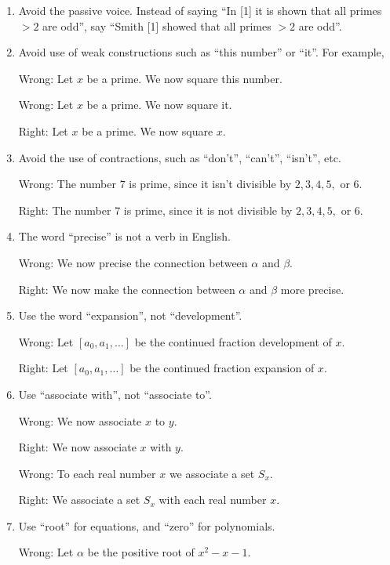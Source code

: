 \documentclass[12pt]{article}
\begin{document}
\begin{enumerate}

\item Avoid the passive voice.  Instead of saying ``In
[1] it is shown that all primes $> 2$ are odd'', say ``Smith [1] showed
that all primes $>2$ are odd''.

\item Avoid use of weak constructions such as ``this number'' or
``it''.  For example,

Wrong:  Let $x$ be a prime.  We now square this number.

Wrong:  Let $x$ be a prime.  We now square it.

Right:  Let $x$ be a prime.  We now square $x$.

\item Avoid the use of contractions, such as ``don't'', ``can't'',
``isn't'', etc.

Wrong:  The number $7$ is prime, since it isn't divisible by
$2, 3, 4, 5, $ or $6$.  

Right:  The number $7$ is prime, since it is not divisible by
$2, 3, 4, 5, $ or $6$.

\item The word ``precise'' is not a verb in English.

Wrong:  We now precise the connection between 
$\alpha$ and $\beta$.

Right:  We now make the connection between
$\alpha$ and $\beta$ more precise.

\item Use the word ``expansion'', not ``development''.

Wrong:  Let $[a_0, a_1, \ldots]$ be the continued fraction
development of $x$.

Right:  Let $[a_0, a_1, \ldots]$ be the continued fraction
expansion of $x$.

\item Use ``associate with'', not ``associate to''.

Wrong:  We now associate $x$ to $y$.

Right:  We now associate $x$ with $y$.

Wrong:  To each real number $x$ we associate a set $S_x$.

Right:  We associate a set $S_x$ with each real number $x$.

\item Use ``root'' for equations, and ``zero'' for polynomials. 

Wrong:  Let $\alpha$ be the positive root of $x^2 - x - 1$.


\end{enumerate}
\end{document}
